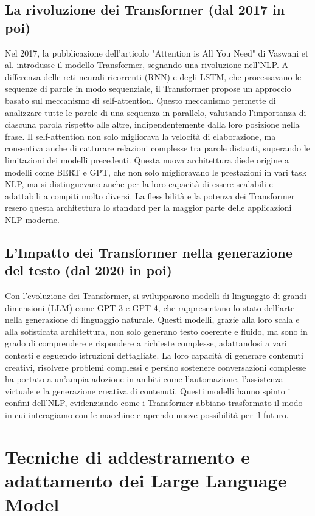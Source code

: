 \documentclass[target=mst,aauheader=,style=]{thud}
\begin{document}
\subsection{La rivoluzione dei Transformer (dal 2017 in poi)}
Nel 2017, la pubblicazione dell’articolo "Attention is All You Need" di Vaswani et al. introdusse il modello Transformer, segnando una rivoluzione nell’NLP. A differenza delle reti neurali ricorrenti (RNN) e degli LSTM, che processavano le sequenze di parole in modo sequenziale, il Transformer propose un approccio basato sul meccanismo di self-attention. Questo meccanismo permette di analizzare tutte le parole di una sequenza in parallelo, valutando l’importanza di ciascuna parola rispetto alle altre, indipendentemente dalla loro posizione nella frase. Il self-attention non solo migliorava la velocità di elaborazione, ma consentiva anche di catturare relazioni complesse tra parole distanti, superando le limitazioni dei modelli precedenti. Questa nuova architettura diede origine a modelli come BERT e GPT, che non solo miglioravano le prestazioni in vari task NLP, ma si distinguevano anche per la loro capacità di essere scalabili e adattabili a compiti molto diversi. La flessibilità e la potenza dei Transformer resero questa architettura lo standard per la maggior parte delle applicazioni NLP moderne.

\subsection{L’Impatto dei Transformer nella generazione del testo (dal 2020 in poi)}
Con l’evoluzione dei Transformer, si svilupparono modelli di linguaggio di grandi dimensioni (LLM) come GPT-3 e GPT-4, che rappresentano lo stato dell’arte nella generazione di linguaggio naturale. Questi modelli, grazie alla loro scala e alla sofisticata architettura, non solo generano testo coerente e fluido, ma sono in grado di comprendere e rispondere a richieste complesse, adattandosi a vari contesti e seguendo istruzioni dettagliate. La loro capacità di generare contenuti creativi, risolvere problemi complessi e persino sostenere conversazioni complesse ha portato a un’ampia adozione in ambiti come l’automazione, l’assistenza virtuale e la generazione creativa di contenuti. Questi modelli hanno spinto i confini dell’NLP, evidenziando come i Transformer abbiano trasformato il modo in cui interagiamo con le macchine e aprendo nuove possibilità per il futuro.

\section{Tecniche di addestramento e adattamento dei Large Language Model}
\end{document}

